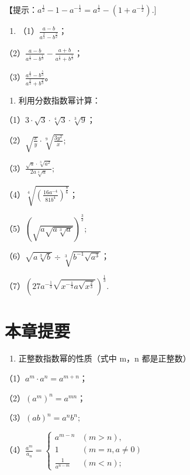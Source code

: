 【提示：\(a^{\frac{1}{2}} - 1 - a^{-\frac{1}{2}} = a^{\frac{1}{2}} - (1 + a^{-\frac{1}{2}}).]\)

\begin{enumerate}[start=6]
\item
  （1）\(\frac{a - b}{a^{\frac{3}{2}} - b^{\frac{3}{2}}}\)；
\end{enumerate}

（2）\(\frac{a - b}{a^{\frac{1}{3}} - b^{\frac{1}{3}}} - \frac{a + b}{a^{\frac{1}{3}} + b^{\frac{1}{3}}}\)；

（3）\(\frac{a^{\frac{4}{3}} - b^{\frac{5}{3}}}{a^{\frac{2}{3}} + b^{\frac{2}{3}}}\)。

\begin{enumerate}[start=7]
\item
  利用分数指数幂计算：
\end{enumerate}

（1）\(3 \cdot \sqrt{3} \cdot \sqrt[4]{3} \cdot \sqrt[3]{9}\)；

（2）\(\sqrt{\frac{x}{y}} \cdot \sqrt[9]{\frac{3y^2}{x}};\)

（3）\(\frac{\sqrt{a} \cdot \sqrt[3]{a^2}}{2a\sqrt[3]{a}};\)

（4）\(\sqrt[4]{\left(\frac{16a^{-4}}{81b^4}\right)^{\frac{8}{6}}}\)；

（5）\(\left(\sqrt{a\sqrt{a\sqrt[3]{a}}}\right)^{\frac{3}{2}};\)

（6）\(\sqrt{a\sqrt[3]{b}}\div\sqrt[3]{b^{-1}\sqrt{a^{3}}}\)；

（7）\(\left(27a^{-\frac{1}{3}}\sqrt{x^{-\frac{1}{3}}a\sqrt{x^{\frac{2}{3}}}}\right)^{\frac{1}{3}}.\)

\section{本章提要}

\begin{enumerate}
\item
  正整数指数幂的性质（式中 m，n 都是正整数）
\end{enumerate}

（1）\(a^m \cdot a^n = a^{m + n}\)；

（2）\((a^{m})^{n} = a^{mn}\)；

（3）\((a b)^{n} = a^{n}b^{n};\)

（4）\(\frac{a^m}{a_n} = \begin{cases} a^{m-n} & (m > n), \\ 1 & (m = n, a \neq 0) \\ \frac{1}{a^{n-m}} & (m < n); \end{cases}\)

